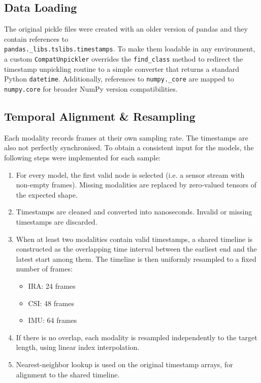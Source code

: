 \subsection{Data Loading}
The original pickle files were created with an older version of pandas and they contain references to \\
\verb|pandas._libs.tslibs.timestamps|. To make them loadable in any environment, a custom \verb|CompatUnpickler| overrides the \verb|find_class| method to redirect the timestamp unpickling routine to a simple converter that returns a standard Python \verb|datetime|. Additionally, references to \verb|numpy._core| are mapped to \verb|numpy.core| for broader NumPy version compatibilities.

\subsection{Temporal Alignment & Resampling}
Each modality records frames at their own sampling rate. The timestamps are also not perfectly synchronised. To obtain a consistent input for the models, the following steps were implemented for each sample:

\begin{enumerate}
	\item For every model, the first valid node is selected (i.e. a sensor stream with non-empty frames). Missing modalities are replaced by zero-valued tensors of the expected shape.
	\item Timestamps are cleaned and converted into nanoseconds. Invalid or missing timestamps are discarded.
	\item When at least two modalities contain valid timestamps, a shared timeline is constructed as the overlapping time interval between the earliest end and the latest start among them. The timeline is then uniformly resampled to a fixed number of frames:
	\begin{itemize}
		\item IRA: 24 frames
		\item CSI: 48 frames
		\item IMU: 64 frames
	\end{itemize}
	\item If there is no overlap, each modality is resampled independently to the target length, using linear index interpolation.
	\item Nearest-neighbor lookup is used on the original timestamp arrays, for alignment to the shared timeline.
\end{enumerate}

